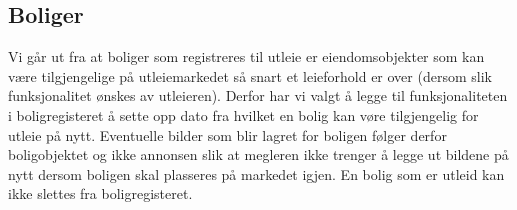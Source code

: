 \subsection{Boliger}
Vi går ut fra at boliger som registreres til utleie er eiendomsobjekter som kan være tilgjengelige på utleiemarkedet så snart et leieforhold er over (dersom slik funksjonalitet ønskes av utleieren). Derfor har vi valgt å legge til funksjonaliteten i boligregisteret å sette opp dato fra hvilket en bolig kan vøre tilgjengelig for utleie på nytt. Eventuelle bilder som blir lagret for boligen følger derfor boligobjektet og ikke annonsen slik at megleren ikke trenger å legge ut bildene på nytt dersom boligen skal plasseres på markedet igjen. En bolig som er utleid kan ikke slettes fra boligregisteret.

